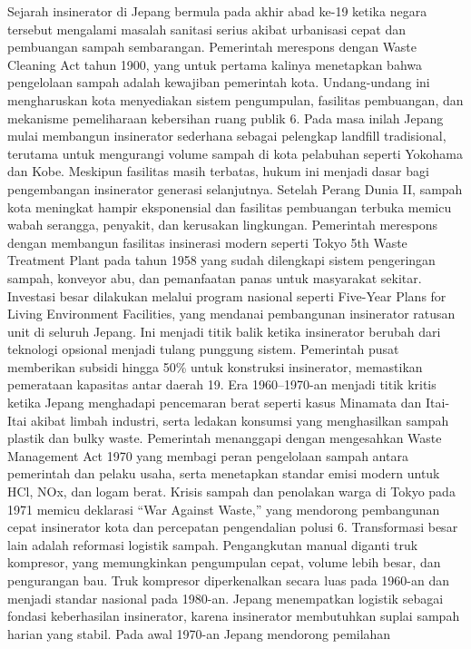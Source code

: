 \documentclass[
  letterpaper,
  DIV=11,
  numbers=noendperiod]{scrreprt}
\begin{document}
Sejarah insinerator di Jepang bermula pada akhir abad ke-19 ketika
negara tersebut mengalami masalah sanitasi serius akibat urbanisasi
cepat dan pembuangan sampah sembarangan. Pemerintah merespons dengan
Waste Cleaning Act tahun 1900, yang untuk pertama kalinya menetapkan
bahwa pengelolaan sampah adalah kewajiban pemerintah kota. Undang-undang
ini mengharuskan kota menyediakan sistem pengumpulan, fasilitas
pembuangan, dan mekanisme pemeliharaan kebersihan ruang publik 6. Pada
masa inilah Jepang mulai membangun insinerator sederhana sebagai
pelengkap landfill tradisional, terutama untuk mengurangi volume sampah
di kota pelabuhan seperti Yokohama dan Kobe. Meskipun fasilitas masih
terbatas, hukum ini menjadi dasar bagi pengembangan insinerator generasi
selanjutnya. Setelah Perang Dunia II, sampah kota meningkat hampir
eksponensial dan fasilitas pembuangan terbuka memicu wabah serangga,
penyakit, dan kerusakan lingkungan. Pemerintah merespons dengan
membangun fasilitas insinerasi modern seperti Tokyo 5th Waste Treatment
Plant pada tahun 1958 yang sudah dilengkapi sistem pengeringan sampah,
konveyor abu, dan pemanfaatan panas untuk masyarakat sekitar. Investasi
besar dilakukan melalui program nasional seperti Five-Year Plans for
Living Environment Facilities, yang mendanai pembangunan insinerator
ratusan unit di seluruh Jepang. Ini menjadi titik balik ketika
insinerator berubah dari teknologi opsional menjadi tulang punggung
sistem. Pemerintah pusat memberikan subsidi hingga 50\% untuk konstruksi
insinerator, memastikan pemerataan kapasitas antar daerah 19. Era
1960--1970-an menjadi titik kritis ketika Jepang menghadapi pencemaran
berat seperti kasus Minamata dan Itai-Itai akibat limbah industri, serta
ledakan konsumsi yang menghasilkan sampah plastik dan bulky waste.
Pemerintah menanggapi dengan mengesahkan Waste Management Act 1970 yang
membagi peran pengelolaan sampah antara pemerintah dan pelaku usaha,
serta menetapkan standar emisi modern untuk HCl, NOx, dan logam berat.
Krisis sampah dan penolakan warga di Tokyo pada 1971 memicu deklarasi
``War Against Waste,'' yang mendorong pembangunan cepat insinerator kota
dan percepatan pengendalian polusi 6. Transformasi besar lain adalah
reformasi logistik sampah. Pengangkutan manual diganti truk kompresor,
yang memungkinkan pengumpulan cepat, volume lebih besar, dan pengurangan
bau. Truk kompresor diperkenalkan secara luas pada 1960-an dan menjadi
standar nasional pada 1980-an. Jepang menempatkan logistik sebagai
fondasi keberhasilan insinerator, karena insinerator membutuhkan suplai
sampah harian yang stabil. Pada awal 1970-an Jepang mendorong pemilahan
\end{document}
